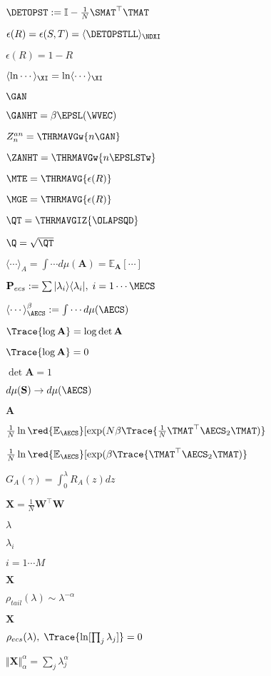 $\DETOPST:=\mathbb{I}-\tfrac{1}{N}\SMAT^{\top}\TMAT$

$\epsilon(R)=\epsilon(S,T)=\langle\DETOPSTLL\rangle_{\NDXI}$

$\epsilon(R)=1-R$

$\langle\ln\cdots\rangle_{\XI}=\ln\langle\cdots\rangle_{\XI}$

$\GAN$

$\GANHT=\beta\EPSL(\WVEC)$

$Z^{an}_{n}=\THRMAVGw{n\GAN}$

$\ZANHT=\THRMAVGw{n\EPSLSTw}$

$\MTE=\THRMAVG{\epsilon(R)}$

$\MGE=\THRMAVG{\epsilon(R)}$

$\QT=\THRMAVGIZ{\OLAPSQD}$

$\Q=\sqrt{\QT}$

$\langle\cdots\rangle_{A}=\int\cdots d\mu(\mathbf{A})=\mathbb{E}_{\mathbf{A}}[\cdots]$

$\mathbf{P}_{ecs} := \sum |\lambda_{i}\rangle\langle\lambda_{i}|,\;i=1\cdots\MECS$

$\langle \cdots \rangle^{\beta}_{\AECS}:=\int \cdots d\mu(\AECS)$

$\Trace{\log\mathbf{A}}=\log\det\mathbf{A}$

$\Trace{\log\mathbf{A}}=0$

$\det\mathbf{A}=1$

$d\mu(\mathbf{S})\rightarrow d\mu(\AECS)$

$\mathbf{A}$

$\frac{1}{N}\ln\red{\mathbb{E}_{\AECS}}[\exp(N\beta\Trace{\tfrac{1}{N}\TMAT^{\top}\AECS_{2}\TMAT)}$

$\frac{1}{N}\ln\red{\mathbb{E}_{\AECS}}[\exp(\beta\Trace{\TMAT^{\top}\AECS_{2}\TMAT)}$

$G_{A}(\gamma)=\int_{0}^{\lambda}R_{A}(z)dz$

$\mathbf{X}=\tfrac{1}{N}\mathbf{W}^{\top}\mathbf{W}$

$\lambda$

$\lambda_{i}$

$i=1\cdots M$

$\mathbf{X}$

$\rho_{tail}(\lambda)\sim\lambda^{-\alpha}$

$\mathbf{X}$

$\rho_{ecs}(\lambda),\;\Trace{\ln[\prod_{j}\lambda_{j}]}=0$

$\Vert\mathbf{X}\Vert^{\alpha}_{\alpha}=\sum_{j}\lambda_{j}^{\alpha}$

